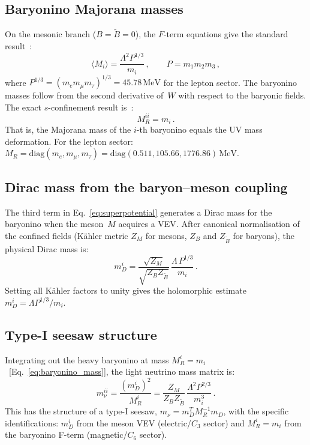 \documentclass[aps,prd,twocolumn,showpacs,preprintnumbers,superscriptaddress,floatfix]{revtex4-2}
\newcommand{\diag}{\mathrm{diag}}
\newcommand{\MeV}{\,\mathrm{MeV}}
\begin{document}
\subsection{Baryonino Majorana masses}

On the mesonic branch ($B = \tilde{B} = 0$), the $F$-term
equations give the standard
result~\cite{Seiberg:1994bz,Rivero:2024epjc}:
\begin{equation}
  \langle M_i \rangle = \frac{\Lambda^2 P^{1/3}}{m_i}\,,
  \qquad P = m_1 m_2 m_3\,,
  \label{eq:seiberg_seesaw}
\end{equation}
where $P^{1/3} = (m_e m_\mu m_\tau)^{1/3} = 45.78\MeV$ for the
lepton sector.
The baryonino masses follow from the second derivative of~$W$
with respect to the baryonic fields.
The exact $s$-confinement result is~\cite{Rivero:2024epjc}:
\begin{equation}
  M_R^{ii} = m_i\,.
  \label{eq:baryonino_mass}
\end{equation}
That is, the Majorana mass of the $i$-th baryonino equals the UV
mass deformation.
For the lepton sector:
$M_R = \diag(m_e, m_\mu, m_\tau)
= \diag(0.511, 105.66, 1776.86)\MeV$.

\subsection{Dirac mass from the baryon--meson coupling}

The third term in Eq.~\eqref{eq:superpotential} generates a Dirac
mass for the baryonino when the meson~$M$ acquires a VEV.
After canonical normalisation of the confined fields
(K\"ahler metric $Z_M$ for mesons, $Z_B$ and $Z_{\tilde{B}}$ for
baryons), the physical Dirac mass is:
\begin{equation}
  m_D^i
    = \frac{\sqrt{Z_M}}{\sqrt{Z_B Z_{\tilde{B}}}}\,
      \frac{\Lambda\,P^{1/3}}{m_i}\,.
  \label{eq:dirac_mass}
\end{equation}
Setting all K\"ahler factors to unity gives the holomorphic
estimate $m_D^i = \Lambda P^{1/3}/m_i$.

\subsection{Type-I seesaw structure}

Integrating out the heavy baryonino at mass
$M_R^i = m_i$~[Eq.~\eqref{eq:baryonino_mass}], the light
neutrino mass matrix is:
\begin{equation}
  m_\nu^{ii}
    = \frac{(m_D^i)^2}{M_R^i}
    = \frac{Z_M}{Z_B Z_{\tilde{B}}}\,
      \frac{\Lambda^2 P^{2/3}}{m_i^3}\,.
  \label{eq:seesaw}
\end{equation}
This has the structure of a type-I seesaw,
$m_\nu = m_D^T M_R^{-1} m_D$, with the specific identifications:
$m_D^i$ from the meson VEV (electric/$C_3$ sector) and
$M_R^i = m_i$ from the baryonino F-term
(magnetic/$C_6$ sector).
\end{document}
